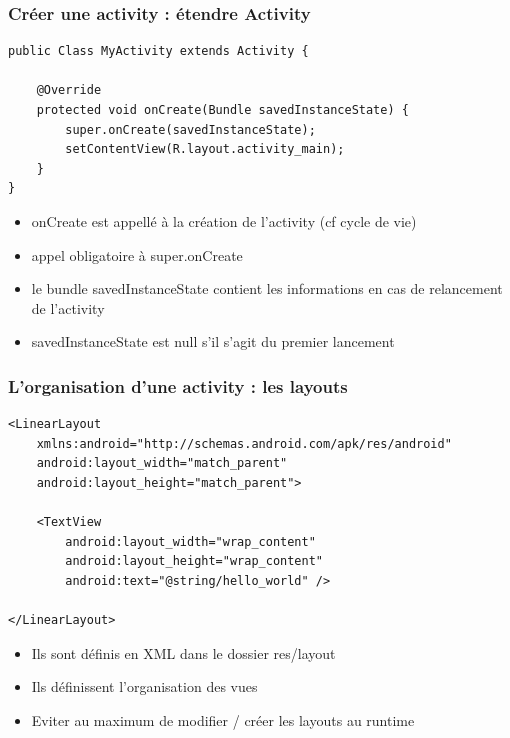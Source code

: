 \documentclass{beamer}
\begin{document}
\begin{frame}[fragile]
\frametitle{Créer une activity : étendre Activity} 
\begin{lstlisting}
public Class MyActivity extends Activity {

    @Override
    protected void onCreate(Bundle savedInstanceState) {
        super.onCreate(savedInstanceState);
        setContentView(R.layout.activity_main);
    }
}
\end{lstlisting}
 \begin{itemize}
 \item onCreate est appellé à la création de l'activity (cf cycle de vie)
 \item appel obligatoire à super.onCreate
 \item le bundle savedInstanceState contient les informations en cas de
 relancement de l'activity
 \item savedInstanceState est null s'il s'agit du premier lancement
 \end{itemize}
\end{frame}
\begin{frame}[fragile]
\frametitle{L'organisation d'une activity : les layouts} 
\begin{lstlisting}
<LinearLayout 
	xmlns:android="http://schemas.android.com/apk/res/android"
    android:layout_width="match_parent"
    android:layout_height="match_parent">

    <TextView
        android:layout_width="wrap_content"
        android:layout_height="wrap_content"
        android:text="@string/hello_world" />

</LinearLayout>
\end{lstlisting}
 \begin{itemize}
 \item Ils sont définis en XML dans le dossier res/layout
 \item Ils définissent l'organisation des vues
 \item Eviter au maximum de modifier / créer les layouts au runtime
 \end{itemize}
\end{frame}
\end{document}
